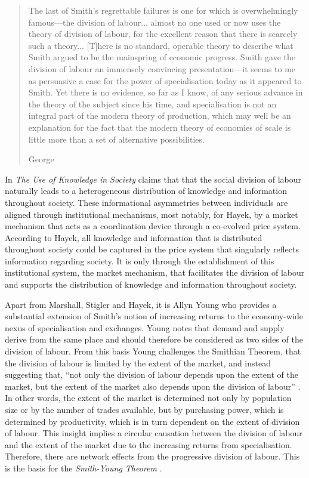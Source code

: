 \begin{quote}
The last of Smith's regrettable failures is one for which is overwhelmingly famous---the division of labour... almost no one used or now uses the theory of division of labour, for the excellent reason that there is scarcely such a theory... [T]here is no standard, operable theory to describe what Smith argued to be the mainspring of economic progress. Smith gave the division of labour an immensely convincing presentation---it seems to me as persuasive a case for the power of specialisation today as it appeared to Smith. Yet there is no evidence, so far as I know, of any serious advance in the theory of the subject since his time, and specialisation is not an integral part of the modern theory of production, which may well be an explanation for the fact that the modern theory of economies of scale is little more than a set of alternative possibilities.

\begin{flushright}
George \citet[p.~1209--1210]{Stigler1976}
\end{flushright}
\end{quote}

In \emph{The Use of Knowledge in Society} \citet{Hayek1945} claims that that the social division of labour naturally leads to a heterogeneous distribution of knowledge and information throughout society. These informational asymmetries between individuals are aligned through institutional mechanisms, most notably, for Hayek, by a market mechanism that acts as a coordination device through a co-evolved price system. According to Hayek, all knowledge and information that is distributed throughout society could be captured in the price system that singularly reflects information regarding society. It is only through the establishment of this institutional system, the market mechanism, that facilitates the division of labour and supports the distribution of knowledge and information throughout society.

Apart from Marshall, Stigler and Hayek, it is Allyn Young who provides a substantial extension of Smith's notion of increasing returns to the economy-wide nexus of specialisation and exchanges. Young notes that demand and supply derive from the same place and should therefore be considered as two sides of the division of labour. From this basis Young challenges the Smithian Theorem, that the division of labour is limited by the extent of the market, and instead suggesting that, ``not only the division of labour depends upon the extent of the market, but the extent of the market also depends upon the division of labour'' \citep[p.~539]{Young1928}. In other words, the extent of the market is determined not only by population size or by the number of trades available, but by purchasing power, which is determined by productivity, which is in turn dependent on the extent of division of labour. This insight implies a circular causation between the division of labour and the extent of the market due to the increasing returns from specialisation. Therefore, there are network effects from the progressive division of labour. This is the basis for the \textit{Smith-Young Theorem} \citep{Yang2001}.

